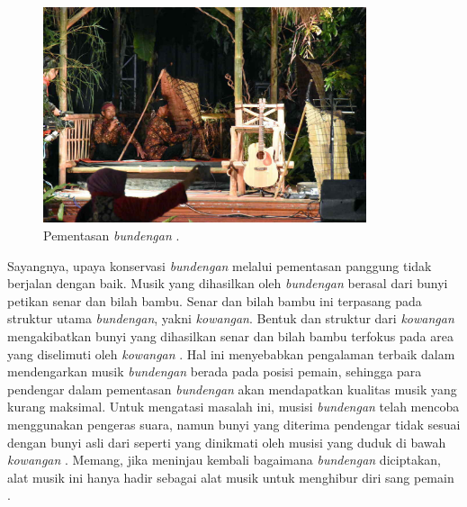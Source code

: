 \begin{figure}[t!]
    \centering
    \includegraphics[width=9.5cm]{Gambar/Pentas Bundengan.jpg}
    \caption{Pementasan \textit{bundengan} \cite{pentasBundengan}.}
    \label{fig:konserBundengan}
\end{figure}
Sayangnya, upaya konservasi \textit{bundengan} melalui pementasan panggung tidak berjalan dengan baik. Musik yang dihasilkan oleh \textit{bundengan} berasal dari bunyi petikan senar dan bilah bambu. Senar dan bilah bambu ini terpasang pada struktur utama \textit{bundengan}, yakni \textit{kowangan}. Bentuk dan struktur dari \textit{kowangan} mengakibatkan bunyi yang dihasilkan senar dan bilah bambu terfokus pada area yang diselimuti oleh \textit{kowangan} \cite{alatMusikPersonal}. Hal ini menyebabkan pengalaman terbaik dalam mendengarkan musik \textit{bundengan} berada pada posisi pemain, sehingga para pendengar dalam pementasan \textit{bundengan} akan mendapatkan kualitas musik yang kurang maksimal. Untuk mengatasi masalah ini, musisi \textit{bundengan} telah mencoba menggunakan pengeras suara, namun bunyi yang diterima pendengar tidak sesuai dengan bunyi asli dari \bundengan seperti yang dinikmati oleh musisi yang duduk di bawah \textit{kowangan} \cite{alatMusikPersonal}. Memang, jika meninjau kembali bagaimana \textit{bundengan} diciptakan, alat musik ini hanya hadir sebagai alat musik untuk menghibur diri sang pemain \cite{palmer2}. \par 




